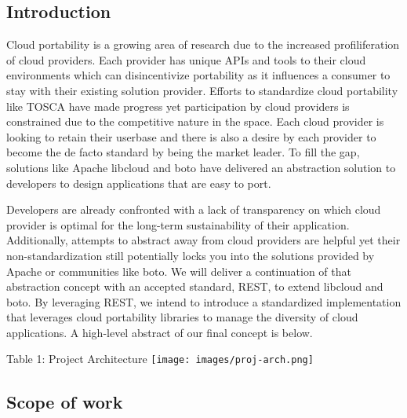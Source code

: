 \label{restful-api-service-to-enable-ease-of-portability-leveraging-botolibcloud}


\subsection{Introduction}\label{introduction}

Cloud portability is a growing area of research due to the increased
profiliferation of cloud providers. Each provider has unique APIs and
tools to their cloud environments which can disincentivize portability
as it influences a consumer to stay with their existing solution
provider. Efforts to standardize cloud portability like TOSCA have made
progress yet participation by cloud providers is constrained due to the
competitive nature in the space. Each cloud provider is looking to
retain their userbase and there is also a desire by each provider to
become the de facto standard by being the market leader. To fill the
gap, solutions like Apache libcloud and boto have delivered an
abstraction solution to developers to design applications that are easy
to port.

Developers are already confronted with a lack of transparency on which
cloud provider is optimal for the long-term sustainability of their
application. Additionally, attempts to abstract away from cloud
providers are helpful yet their non-standardization still potentially
locks you into the solutions provided by Apache or communities like
boto. We will deliver a continuation of that abstraction concept with an
accepted standard, REST, to extend libcloud and boto. By leveraging
REST, we intend to introduce a standardized implementation that
leverages cloud portability libraries to manage the diversity of cloud
applications. A high-level abstract of our final concept is below.

Table 1: Project Architecture \texttt{[image: images/proj-arch.png]}

\subsection{Scope of work}\label{scope-of-work}

